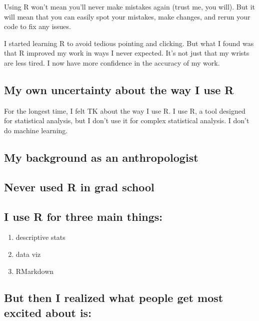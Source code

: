 \documentclass[
]{book}
\providecommand{\tightlist}{%
  \setlength{\itemsep}{0pt}\setlength{\parskip}{0pt}}
\begin{document}
Using R won't mean you'll never make mistakes again (trust me, you will). But it will mean that you can easily spot your mistakes, make changes, and rerun your code to fix any issues.

I started learning R to avoid tedious pointing and clicking. But what I found was that R improved my work in ways I never expected. It's not just that my wrists are less tired. I now have more confidence in the accuracy of my work.

\hypertarget{my-own-uncertainty-about-the-way-i-use-r}{%
\subsection{My own uncertainty about the way I use R}\label{my-own-uncertainty-about-the-way-i-use-r}}

For the longest time, I felt TK about the way I use R. I use R, a tool designed for statistical analysis, but I don't use it for complex statistical analysis. I don't do machine learning.

\hypertarget{my-background-as-an-anthropologist}{%
\subsection{My background as an anthropologist}\label{my-background-as-an-anthropologist}}

\hypertarget{never-used-r-in-grad-school}{%
\subsection{Never used R in grad school}\label{never-used-r-in-grad-school}}

\hypertarget{i-use-r-for-three-main-things}{%
\subsection{I use R for three main things:}\label{i-use-r-for-three-main-things}}

\begin{enumerate}
\def\labelenumi{\arabic{enumi}.}
\tightlist
\item
  descriptive stats
\item
  data viz
\item
  RMarkdown
\end{enumerate}

\hypertarget{but-then-i-realized-what-people-get-most-excited-about-is}{%
\subsection{But then I realized what people get most excited about is:}\label{but-then-i-realized-what-people-get-most-excited-about-is}}
\end{document}
